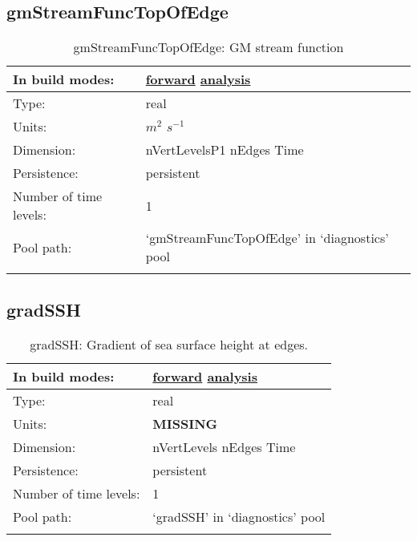 \subsection[gmStreamFuncTopOfEdge]{gmStreamFuncTopOfEdge}
\label{subsec:var_sec_diagnostics_gmStreamFuncTopOfEdge}
\begin{center}
\begin{longtable}{| p{2.0in} | p{4.0in} |}
        \hline 
        In build modes: & \hyperref[subsec:forward_var_tab_diagnostics]{forward} \hyperref[subsec:analysis_var_tab_diagnostics]{analysis} \\
        \hline 
        Type: & real \\
        \hline 
        Units: & $m^2$ $s^{-1}$ \\
        \hline 
        Dimension: & nVertLevelsP1 nEdges Time \\
        \hline 
        Persistence: & persistent \\
        \hline 
        Number of time levels: & 1 \\
        \hline 
            Pool path: & `gmStreamFuncTopOfEdge' in `diagnostics' pool \\
		 \hline 
    \caption{gmStreamFuncTopOfEdge: GM stream function}
\end{longtable}
\end{center}
\subsection[gradSSH]{gradSSH}
\label{subsec:var_sec_diagnostics_gradSSH}
\begin{center}
\begin{longtable}{| p{2.0in} | p{4.0in} |}
        \hline 
        In build modes: & \hyperref[subsec:forward_var_tab_diagnostics]{forward} \hyperref[subsec:analysis_var_tab_diagnostics]{analysis} \\
        \hline 
        Type: & real \\
        \hline 
        Units: & {\bf \color{red} MISSING} \\
        \hline 
        Dimension: & nVertLevels nEdges Time \\
        \hline 
        Persistence: & persistent \\
        \hline 
        Number of time levels: & 1 \\
        \hline 
            Pool path: & `gradSSH' in `diagnostics' pool \\
		 \hline 
    \caption{gradSSH: Gradient of sea surface height at edges.}
\end{longtable}
\end{center}
